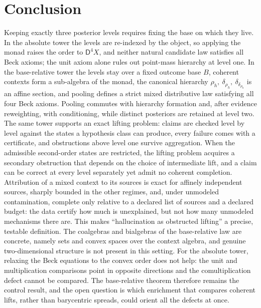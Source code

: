 \documentclass[11pt]{article}
\theoremstyle{definition}
\theoremstyle{remark}
\newcommand{\D}{\mathsf{D}}
\begin{document}
\section{Conclusion}

Keeping exactly three posterior levels requires fixing the base on which they live. In the
absolute tower the levels are re-indexed by the object, so applying the monad raises the order to
$\D^4X$, and neither natural candidate law satisfies all Beck axioms; the unit axiom alone rules out
point-mass hierarchy at level one. In the base-relative tower the levels stay over a fixed outcome
base $B$, coherent contexts form a sub-algebra of the monad, the canonical hierarchy
$\rho_h,\ \delta_{\rho_h},\ \delta_{\delta_{\rho_h}}$ is an affine section, and pooling defines a strict
mixed distributive law satisfying all four Beck axioms. Pooling commutes with hierarchy formation and, after evidence reweighting, with conditioning,
while distinct posteriors are retained at level two. The same tower supports an exact lifting
problem: claims are checked level by level against the states a hypothesis class can produce, every
failure comes with a certificate, and obstructions above level one survive aggregation. When the
admissible second-order states are restricted, the lifting problem acquires a secondary obstruction
that depends on the choice of intermediate lift, and a claim can be correct at every level separately
yet admit no coherent completion. Attribution of a mixed context to its sources is exact for affinely
independent sources, sharply bounded in the other regimes, and, under unmodeled contamination,
complete only relative to a declared list of sources and a declared budget: the data certify how much
is unexplained, but not how many unmodeled mechanisms there are. This makes
``hallucination as obstructed lifting'' a precise, testable definition. The coalgebras and
bialgebras of the base-relative law are concrete, namely sets and convex spaces over the context
algebra, and genuine two-dimensional structure is not present in this setting. For the absolute
tower, relaxing the Beck equations to the convex order does not help: the unit and multiplication
comparisons point in opposite directions and the comultiplication defect cannot be compared. The
base-relative theorem therefore remains the control result, and the open question is which enrichment
that compares coherent lifts, rather than barycentric spreads, could orient all the defects at once.
\end{document}
